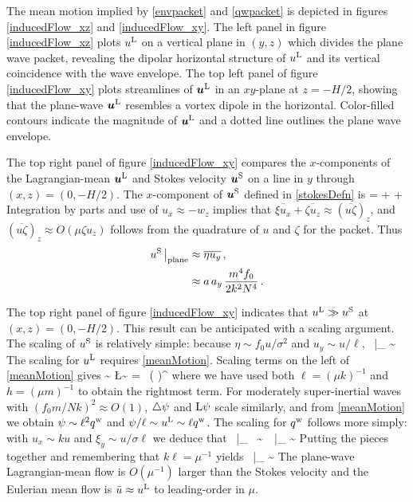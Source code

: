 \documentclass[12pt, oneside]{book}
\begin{document}
The mean motion implied by \eqref{envpacket} and \eqref{qwpacket} is depicted in figures \ref{inducedFlow_xz} and \ref{inducedFlow_xy}.  The left panel in figure \ref{inducedFlow_xz} plots $u^{\mathrm{L}}$ on a vertical plane in $(y,z)$ which divides the plane wave packet, revealing the dipolar horizontal structure of $u^{\mathrm{L}}$ and its vertical coincidence with the wave envelope.  The top left panel of figure \ref{inducedFlow_xy} plots streamlines of $\boldsymbol{u}^{\mathrm{L}}$ in an $xy$-plane at $z=-H/2$, showing that the plane-wave $\boldsymbol{u}^{\mathrm{L}}$ resembles a vortex dipole in the horizontal.  Color-filled contours indicate the magnitude of $\boldsymbol{u}^{\mathrm{L}}$ and a dotted line outlines the plane wave envelope.

The top right panel of figure \ref{inducedFlow_xy} compares the $x$-components of the Lagrangian-mean $\boldsymbol{u}^{\mathrm{L}}$ and Stokes velocity $\boldsymbol{u}^{\mathrm{S}}$ on a line in $y$ through $(x,z) = (0,-H/2)$.  The $x$-component of $\boldsymbol{u}^{\mathrm{S}}$ defined in \eqref{stokesDefn} is
\beq
\uS {} {} =  +  +  \per
\label{uSdefn}
\eeq
Integration by parts and use of $u_x \approx - w_z$ implies that $\overline{\xi u_x}+\overline{\zeta u_z} \approx \left ( \overline{u \zeta} \right )_{\! z}$, and $\left ( \overline{u \zeta} \right )_{\! z} \approx O(\mu \zeta u_z)$ follows from the quadrature of $u$ and $\zeta$ for the packet.  Thus
\begin{align}
u^{\mathrm{S}} \, \big |_{\mathrm{plane}} &\approx \overline{\eta u_y} \, , \\
&\approx a \, a_y \, \frac{m^4 f_0}{2 k^2 N^4} \, .
\label{packetdrift}
\end{align}

The top right panel of figure \ref{inducedFlow_xy} indicates that $u^{\mathrm{L}} \gg u^{\mathrm{S}}$ at $(x,z)=(0,-H/2)$.  This result can be anticipated with a scaling argument.  The scaling of $u^{\mathrm{S}}$ is relatively simple: because $\eta \sim f_0 u / \sigma^2$ and $u_y \sim u / \ell$,
\beq
\uS  \, \big |_{} \sim   {}\per
\eeq
The scaling for $u^{\mathrm{L}}$ requires \eqref{meanMotion}.  Scaling terms on the left of \eqref{meanMotion} gives
\beq
\hlap \psi \sim {} \com \qquad {} \qquad \L \psi \sim {} = \, \left (  \right )^{}  \com
\eeq
where we have used both $\ell = (\mu k)^{-1}$ and $h = (\mu m)^{-1}$ to obtain the rightmost term.  For moderately super-inertial waves with $(f_0 m / N k)^2 \approx O(1)$, $\triangle \psi$ and $\mathrm{L} \psi$ scale similarly, and from \eqref{meanMotion} we obtain $\psi \sim \ell^2 q^{\mathrm{w}}$ and $\psi / \ell \sim u^{\mathrm{L}} \sim \ell q^{\mathrm{w}}$.   The scaling for $q^{\mathrm{w}}$ follows more simply: with $u_x \sim k u$ and $\xi_y \sim u / \sigma \ell$ we deduce that
\beq
\qdag  \, \big |_{} \, \sim \,  \com \qquad {} \qquad \uL  \, \big |_{} \sim {} \per
\eeq
Putting the pieces together and remembering that $k \ell = \mu^{-1}$ yields
\beq
\frac{\uL}{\uS}  \, \big |_{} \sim {} \per
\eeq
The plane-wave Lagrangian-mean flow is $O(\mu^{-1})$ larger than the Stokes velocity and the Eulerian mean flow is $\bar u \approx u^{\mathrm{L}}$ to leading-order in $\mu$.
\end{document}
